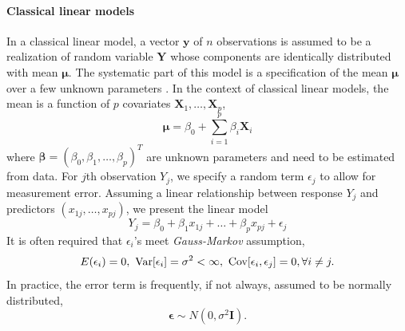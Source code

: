 \paragraph{Classical linear models}\label{para:clm}
In a classical linear model, a vector $\bm y$ of $n$ observations is assumed to be a realization
of random variable $\bm Y$ whose components are identically distributed with mean $\bm \mu$. The
systematic part of this model is a specification of the mean $\bm\mu$ over a few unknown parameters
\citep{mccullagh1989generalized}. In the context of classical linear models, the mean is a function
of $p$ covariates $\bm X_1, \ldots, \bm X_p$,
\begin{equation}\label{eq:clm}
	\bm \mu =\beta_0 + \sum_{i=1}^p\beta_i \bm X_i
\end{equation}	
where $\bm \beta = (\beta_0, \beta_1, \ldots, \beta_p)^T$ are unknown parameters and need to be 
estimated from data. For $j$th %
observation $Y_j$, we specify a random term $\epsilon_j$ to allow for measurement error.
Assuming a linear relationship between response $Y_j$ and predictors $(x_{1j}, \ldots, x_{pj})$, we
present the linear model 
\begin{equation}\label{eq:clm2}
	Y_j= \beta_0 + \beta_1x_{1j} + \ldots + \beta_p x_{pj} + \epsilon_j
\end{equation}
It is often required that $\epsilon_i$'s meet \textit{Gauss-Markov} assumption,
\begin{equation}\label{eq:gauss-markov}
	E(\epsilon_i)=0,~ \text{Var}[\epsilon_i]=
	\sigma^2<\infty, ~\text{Cov}[\epsilon_i, \epsilon_j]=0, \forall i \neq j.
\end{equation}
In practice, the error term is frequently, if not always, assumed to be normally distributed, 
\begin{equation}\label{eq:normalassumption1}
	\bm \epsilon \sim N(0, \sigma^2 \bm I).
\end{equation}

